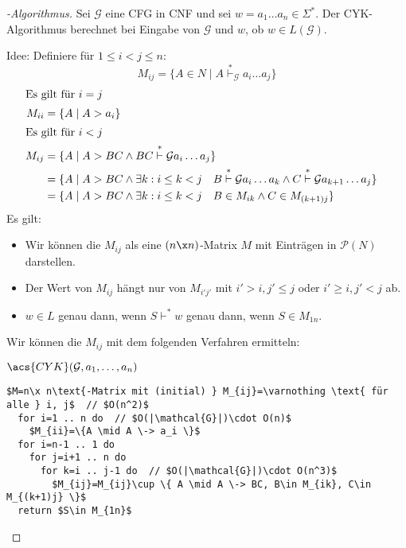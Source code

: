 \begin{proof}[-Algorithmus] Sei $\mathcal{G}$ eine \ac{CFG} in \ac{CNF} und sei $w = a_1\dots a_n\in\Sigma^*$.
Der \ac{CYK}-Algorithmus berechnet bei Eingabe von $\mathcal{G}$ und $w$, ob $w\in L(\mathcal{G})$.

Idee: Definiere für $1\leq i < j\leq n$:
$$M_{ij} = \{ A \in N \mid A \stackrel{*}{\vdash}_\mathcal{G} a_i\dots a_j \}$$
	\begin{align*}
	\intertext{Es gilt für $i=j$}
		M_{ii} &= \{A \mid A\-> a_i \} \\
	\intertext{Es gilt für $i<j$}
		M_{ij} &= \{ A \mid A\-> BC \land BC \stackrel{*}{\vdash}\mathcal{G} a_i\dots a_j \}\\
		&= \{ A \mid A\-> BC \land \exists k: i\leq k<j\quad 
			\begin{aligned}[t]
				B &\stackrel{*}{\vdash}\mathcal{G} a_i\dots a_k \land C \stackrel{*}{\vdash}\mathcal{G} a_{k+1}\dots a_j \}
			\end{aligned}\\
		&= \{ A \mid A\-> BC \land \exists k: i\leq k<j\quad B\in M_{ik} \land C \in M_{(k+1)j}\}
	\end{align*}
Es gilt:
\begin{itemize}
 \item Wir können die $M_{ij}$ als eine $(n\x n)$-Matrix $M$ mit Einträgen in $\mathcal{P}(N)$ darstellen.
 \item Der Wert von $M_{ij}$ hängt nur von $M_{i'j'}$ mit $i'>i, j'\leq j$ oder $i'\geq i,j'<j$ ab.
 \item $w\in L$ genau dann, wenn $S \vdash^* w$ genau dann, wenn $S \in M_{1n}$.
\end{itemize}

\medskip

Wir können die $M_{ij}$ mit dem folgenden Verfahren ermitteln:
  \begin{center}
$\acs{CYK}(\mathcal{G},a_1,\dots,a_n)$
  \begin{minipage}{12cm}
\begin{lstlisting}[mathescape,morekeywords={for,do,return},morecomment={[l]{//}}]
  $M=n\x n\text{-Matrix mit (initial) } M_{ij}=\varnothing \text{ für alle } i, j$  // $O(n^2)$
  for i=1 .. n do  // $O(|\mathcal{G}|)\cdot O(n)$
    $M_{ii}=\{A \mid A \-> a_i \}$
  for i=n-1 .. 1 do
    for j=i+1 .. n do
      for k=i .. j-1 do  // $O(|\mathcal{G}|)\cdot O(n^3)$
        $M_{ij}=M_{ij}\cup \{ A \mid A \-> BC, B\in M_{ik}, C\in M_{(k+1)j} \}$
  return $S\in M_{1n}$
\end{lstlisting}
\qedherefixlstlisting
\end{minipage}
   \end{center}
\end{proof}


